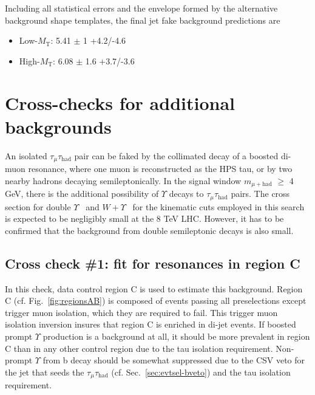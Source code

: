 Including all statistical errors and the envelope formed by the alternative background shape templates, the final jet fake background predictions are

\begin{itemize}
\item Low-$M_{\text{T}}$: 5.41 $\pm$ 1 \stat +4.2/-4.6 \syst
\item High-$M_{\text{T}}$: 6.08 $\pm$ 1.6 \stat +3.7/-3.6 \syst
\end{itemize}

\section{Cross-checks for additional backgrounds\label{sec:bkg-crosschecks}}

An isolated $\tau_{\mu}\tau_{\text{had}}$ pair can be faked by the collimated decay of a boosted di-muon resonance, where one muon is reconstructed as the HPS tau, or by two nearby hadrons decaying semileptonically.  In the signal window $m_{\mu+\text{had}}$ $\geq$ 4 GeV, there is the additional possibility of $\Upsilon$ decays to $\tau_{\mu}\tau_{\text{had}}$ pairs.  The cross section for double $\Upsilon$~\cite{Ko11} and $W + \Upsilon$~\cite{Gang13} for the kinematic cuts employed in this search is expected to be negligibly small at the 8 TeV LHC.  However, it has to be confirmed that the background from double semileptonic decays is also small.

\subsection{Cross check \#1: fit for resonances in region C\label{sec:bkgs-resonances}}

In this check, data control region C is used to estimate this background.  Region C (cf. Fig.~\ref{fig:regionsAB}) is composed of events passing all preselections except trigger muon isolation, which they are required to fail.  This trigger muon isolation inversion insures that region C is enriched in di-jet events.  If boosted prompt $\Upsilon$ production is a background at all, it should be more prevalent in region C than in any other control region due to the tau isolation requirement.  Non-prompt $\Upsilon$ from b decay should be somewhat suppressed due to the CSV veto for the jet that seeds the $\tau_{\mu}\tau_{\text{had}}$ (cf. Sec.~\ref{sec:evtsel-bveto}) and the tau isolation requirement.

